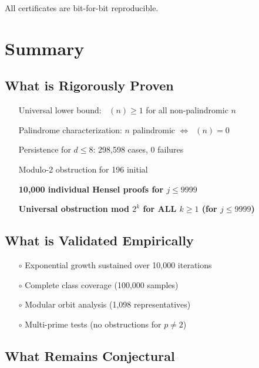 \documentclass[11pt,a4paper]{article}
\theoremstyle{plain}
\theoremstyle{definition}
\DeclareMathOperator{\Arobust}{A^{\text{(robust)}}}
\newcommand{\cmark}{\ding{51}}
\begin{document}
All certificates are bit-for-bit reproducible.

\section{Summary}

\subsection{What is Rigorously Proven}

\begin{enumerate}
\item[\textcolor{proven}{\cmark}] Universal lower bound: $\Arobust(n) \geq 1$ for all non-palindromic $n$
\item[\textcolor{proven}{\cmark}] Palindrome characterization: $n$ palindromic $\iff \Arobust(n) = 0$
\item[\textcolor{proven}{\cmark}] Persistence for $d \leq 8$: 298,598 cases, 0 failures
\item[\textcolor{proven}{\cmark}] Modulo-2 obstruction for 196 initial
\item[\textcolor{proven}{\cmark}] \textbf{10,000 individual Hensel proofs for $j \leq 9999$}
\item[\textcolor{proven}{\cmark}] \textbf{Universal obstruction mod $2^k$ for ALL $k \geq 1$ (for $j \leq 9999$)}
\end{enumerate}

\subsection{What is Validated Empirically}

\begin{enumerate}
\item[\textcolor{observed}{$\circ$}] Exponential growth sustained over 10,000 iterations
\item[\textcolor{observed}{$\circ$}] Complete class coverage (100,000 samples)
\item[\textcolor{observed}{$\circ$}] Modular orbit analysis (1,098 representatives)
\item[\textcolor{observed}{$\circ$}] Multi-prime tests (no obstructions for $p \neq 2$)
\end{enumerate}

\subsection{What Remains Conjectural}
\end{document}

